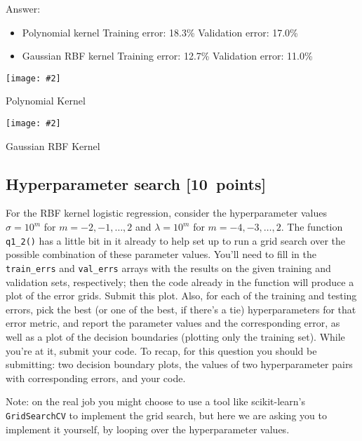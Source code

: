 \documentclass{article}
\newcommand{\blu}[1]{{\textcolor{blu}{#1}}}
\newenvironment{answer}{\par\begingroup\color{gre}Answer: }{\endgroup}
\let\ask\blu
\newcommand\pts[1]{\textcolor{pointscolour}{[#1~points]}}
\newcommand{\centerfig}[2]{\begin{center}\texttt{[image: \#2]}\end{center}}
\begin{document}
\begin{answer}
    \begin{itemize}
        \item Polynomial kernel
        \subitem Training error: 18.3\%
        \subitem Validation error: 17.0\%
        \item Gaussian RBF kernel
        \subitem Training error: 12.7\%
        \subitem Validation error: 11.0\%
    \end{itemize}
\end{answer}

\vspace{5mm}
\centerfig{0.5}{figs/logRegPolynomial}
\begin{center}
    Polynomial Kernel
\end{center}
\vspace{5mm}

\centerfig{0.5}{figs/logRegRBF}
\begin{center}
    Gaussian RBF Kernel
\end{center}




\subsection{Hyperparameter search \pts{10}}

For the RBF kernel logistic regression, consider the hyperparameter values $\sigma=10^m$ for $m=-2,-1,\ldots,2$ and $\lambda=10^m$ for $m=-4,-3,\ldots,2$.
The function \verb|q1_2()| has a little bit in it already to help set up to run a grid search over the possible combination of these parameter values.
You'll need to fill in the \verb|train_errs| and \verb|val_errs| arrays
with the results on the given training and validation sets, respectively;
then the code already in the function will produce a plot of the error grids.
\ask{Submit this plot}.
Also, for each of the training and testing errors,
pick the best (or one of the best, if there's a tie) hyperparameters for that error metric,
and \ask{report the parameter values and the corresponding error, as well as a plot of the decision boundaries (plotting only the training set)}.
While you're at it, \ask{submit your code}.
To recap, for this question you should be submitting:
two decision boundary plots,
the values of two hyperparameter pairs with corresponding errors,
and your code.

Note: on the real job you might choose to use a tool like scikit-learn's \texttt{GridSearchCV} to implement the grid search, but here we are asking you to implement it yourself, by looping over the hyperparameter values.
\end{document}

